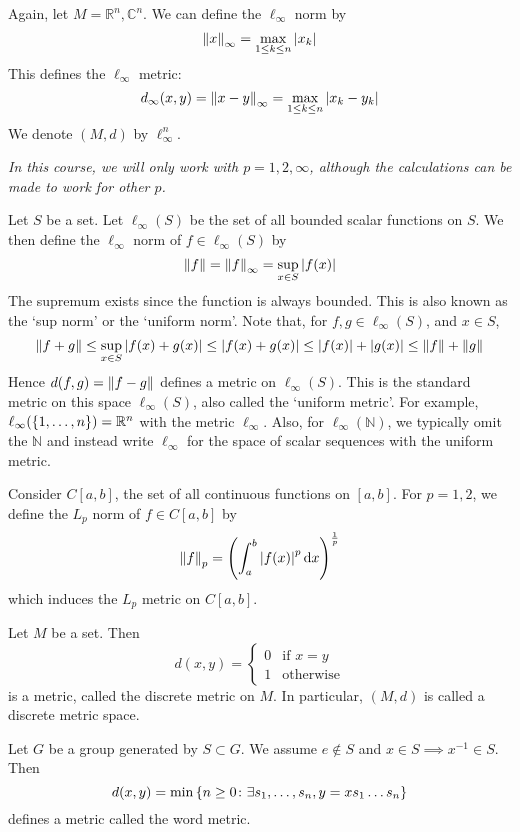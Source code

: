 \begin{example}
	Again, let \( M = \mathbb R^n, \mathbb C^n \).
	We can define the \( \ell_\infty \) norm by
	\[
		\norm{x}_\infty = \max_{1 \leq k \leq n} \abs{x_k}
	\]
	This defines the \( \ell_\infty \) metric:
	\[
		d_\infty(x,y) = \norm{x-y}_\infty = \max_{1 \leq k \leq n} \abs{x_k - y_k}
	\]
	We denote \( (M, d) \) by \( \ell_\infty^n \).
\end{example}
\textit{In this course, we will only work with \( p = 1, 2, \infty \), although the calculations can be made to work for other \( p \).}
\begin{example}
	Let \( S \) be a set.
	Let \( \ell_\infty(S) \) be the set of all bounded scalar functions on \( S \).
	We then define the \( \ell_\infty \) norm of \( f \in \ell_\infty(S) \) by
	\[
		\norm{f} = \norm{f}_\infty = \sup_{x \in S} \abs{f(x)}
	\]
	The supremum exists since the function is always bounded.
	This is also known as the `sup norm' or the `uniform norm'.
	Note that, for \( f,g \in \ell_\infty(S) \), and \( x \in S \),
	\[
		\norm{f+g} \leq \sup_{x \in S} \abs{f(x) + g(x)} \leq \abs{f(x) + g(x)} \leq \abs{f(x)} + \abs{g(x)} \leq \norm{f} + \norm{g}
	\]
	Hence \( d(f,g) =\norm{f-g} \) defines a metric on \( \ell_\infty(S) \).
	This is the standard metric on this space \( \ell_\infty(S) \), also called the `uniform metric'.
	For example, \( \ell_\infty(\qty{1, \dots, n}) = \mathbb R^n \) with the metric \( \ell_\infty \).
	Also, for \( \ell_\infty(\mathbb N) \), we typically omit the \( \mathbb N \) and instead write \( \ell_\infty \) for the space of scalar sequences with the uniform metric.
\end{example}
\begin{example}
	Consider \( C[a,b] \), the set of all continuous functions on \( [a,b] \).
	For \( p = 1,2 \), we define the \( L_p \) norm of \( f \in C[a,b] \) by
	\[
		\norm{f}_p = \qty( \int_a^b \abs{f(x)}^p \dd{x} )^{\frac{1}{p}}
	\]
	which induces the \( L_p \) metric on \( C[a,b] \).
\end{example}
\begin{example}
	Let \( M \) be a set.
	Then
	\[
		d(x,y) = \begin{cases}
			0 & \text{if } x = y \\
			1 & \text{otherwise}
		\end{cases}
	\]
	is a metric, called the discrete metric on \( M \).
	In particular, \( (M, d) \) is called a discrete metric space.
\end{example}
\begin{example}
	Let \( G \) be a group generated by \( S \subset G \).
	We assume \( e \not\in S \) and \( x \in S \implies x^{-1} \in S \).
	Then
	\[
		d(x,y) = \min \qty{ n \geq 0 \colon \exists s_1, \dots, s_n, y = x s_1 \dots s_n }
	\]
	defines a metric called the word metric.
\end{example}
